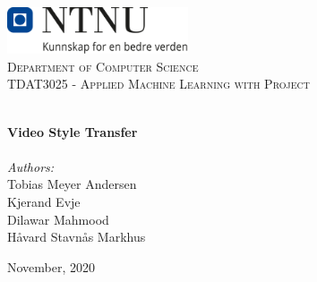 \begin{titlepage}
\vbox{ }
\vbox{ }
\begin{center}
\includegraphics[width=0.40\textwidth]{report/images/NTNU_logo.png}\\[1cm]
\textsc{\LARGE Department of Computer Science}\\[1.5cm]
\textsc{\Large TDAT3025 - Applied Machine Learning with Project }\\[0.5cm]
\vbox{ }

\HRule \\[0.4cm]
{ \huge \bfseries Video Style Transfer}\\[0.4cm]
\HRule \\[1.5cm]

\large
\emph{Authors:}\\
Tobias Meyer Andersen\\
Kjerand Evje\\
Dilawar Mahmood\\
Håvard Stavnås Markhus
\vfill

{\large November, 2020}
\end{center}
\end{titlepage}